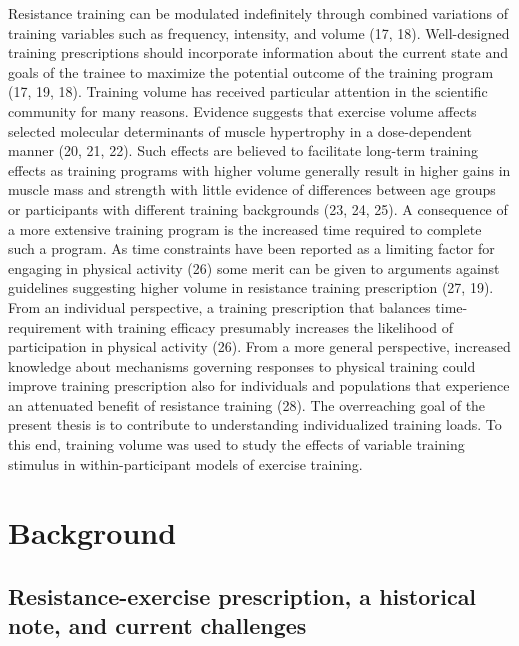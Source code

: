 \documentclass[twoside,10pt]{gihclass} %
\begin{document}
Resistance training can be modulated indefinitely through combined variations of training variables such as frequency, intensity, and volume
(17, 18).
Well-designed training prescriptions should incorporate information about the current state and goals of the trainee to maximize the potential outcome of the training program
(17, 19, 18).
Training volume has received particular attention in the scientific community for many reasons. Evidence suggests that exercise volume affects selected molecular determinants of muscle hypertrophy in a dose-dependent manner
(20, 21, 22).
Such effects are believed to facilitate long-term training effects as training programs with higher volume generally result in higher gains in muscle mass and strength with little evidence of differences between age groups or participants with different training backgrounds
(23, 24, 25).
A consequence of a more extensive training program is the increased time required to complete such a program. As time constraints have been reported as a limiting factor for engaging in physical activity
(26)
some merit can be given to arguments against guidelines suggesting higher volume in resistance training prescription
(27, 19).
From an individual perspective, a training prescription that balances time-requirement with training efficacy presumably increases the likelihood of participation in physical activity (26).
From a more general perspective, increased knowledge about mechanisms governing responses to physical training could improve training prescription also for individuals and populations that experience an attenuated benefit of resistance training
(28).
The overreaching goal of the present thesis is to contribute to understanding individualized training loads. To this end, training volume was used to study the effects of variable training stimulus in within-participant models of exercise training.

\hypertarget{background}{%
\chapter{Background}\label{background}}

\hypertarget{resistance-exercise-prescription-a-historical-note-and-current-challenges}{%
\section{Resistance-exercise prescription, a historical note, and current challenges}\label{resistance-exercise-prescription-a-historical-note-and-current-challenges}}
\end{document}
